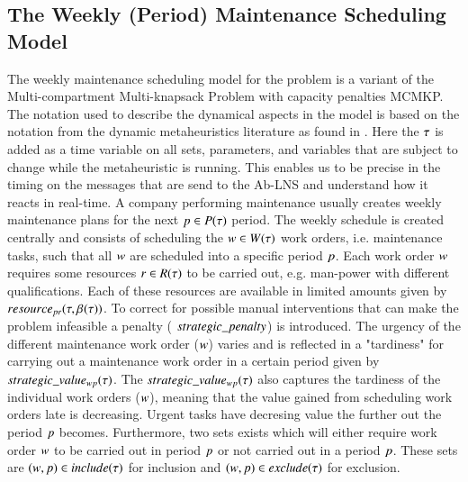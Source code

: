 \subsection{The Weekly (Period) Maintenance Scheduling Model}
The weekly maintenance scheduling model for the problem 
is a variant of the  Multi-compartment Multi-knapsack Problem with capacity penalties MCMKP. 
The notation used to describe the dynamical aspects in the model is based on the notation 
from the dynamic metaheuristics literature as found in \cite{yangMetaheuristicsDynamicCombinatorial2013}. 
Here the $\tau$ is added as a time variable on all sets, parameters, and variables that are
subject to change while the metaheuristic is running. This enables us to be precise in the timing on 
the messages that are send to the Ab-LNS and understand how it reacts in real-time.
A company performing maintenance usually creates weekly maintenance plans for
the next $p \in P(\tau)$ period. The weekly schedule is created
centrally and consists of scheduling the $\ElementWorkOrder \in \SetWorkOrder$
work orders, i.e. maintenance tasks, such that all $w$
are scheduled into a specific period $p$. Each work order $
w$ requires some resources $r \in R(\tau)$
to be carried out, e.g. man-power with different qualifications. Each of these
resources are available in limited amounts given by $resource_{pr}(\tau, \beta_{}(\tau))$. To correct
for possible manual interventions that can make the problem infeasible a penalty (
$strategic\_penalty$) is introduced. The urgency of the different maintenance work order ($w$)
varies and is reflected in a "tardiness" for carrying out a maintenance work
order in a certain period given by $strategic\_value_{w p}(\tau)$. The $strategic\_value_{w p}(\tau)$ also 
captures the tardiness of the individual work orders ($w$), meaning that
the value gained from scheduling work orders late is decreasing. Urgent tasks have
decresing value the further out the period $p$ becomes. 
Furthermore, two sets exists which will either require work order $w$ to be carried
out in period $p$ or not carried out in a period $p$. 
These sets are $(w,p) \in
include(\tau)$ for inclusion and  $(w, p) \in
exclude(\tau)$ for exclusion. 



